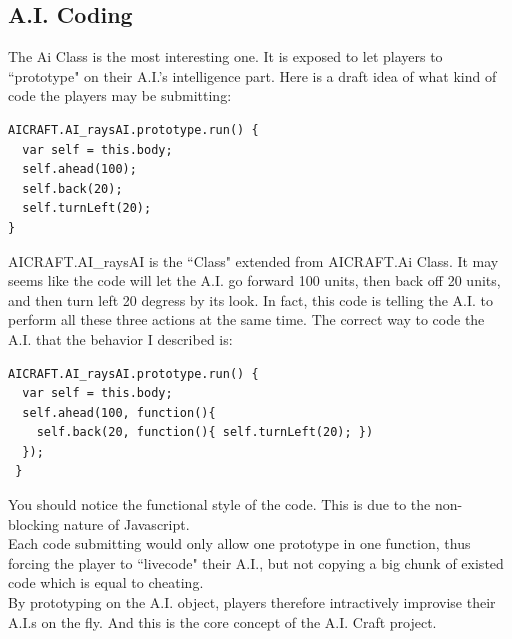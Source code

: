 \documentclass[12pt]{article}
\begin{document}
\subsection{A.I. Coding}
The Ai Class is the most interesting one. It is exposed to let players to ``prototype" on their A.I.'s intelligence part. Here is a draft idea of what kind of code the players may be submitting:
{\color{red}
\begin{verbatim}
AICRAFT.AI_raysAI.prototype.run() {
  var self = this.body;
  self.ahead(100);
  self.back(20);
  self.turnLeft(20);
}
\end{verbatim}
}

AICRAFT.AI\_raysAI is the ``Class" extended from AICRAFT.Ai Class. It may seems like the code will let the A.I. go forward 100 units, then back off 20 units, and then turn left 20 degress by its look. In fact, this code is telling the A.I. to perform all these three actions at the same time. The correct way to code the A.I. that the behavior I described is:\\ 

{\color{red}
\begin{verbatim}
AICRAFT.AI_raysAI.prototype.run() {
  var self = this.body;
  self.ahead(100, function(){
    self.back(20, function(){ self.turnLeft(20); })	
  });
 }
\end{verbatim}
}

You should notice the functional style of the code. This is due to the non-blocking nature of Javascript.\\

Each code submitting would only allow one prototype in one function, thus forcing the player to ``livecode" their A.I., but not copying a big chunk of existed code which is equal to cheating.\\

By prototyping on the A.I. object, players therefore intractively improvise their A.I.s on the fly. And this is the core concept of the A.I. Craft project.\\
\end{document}
